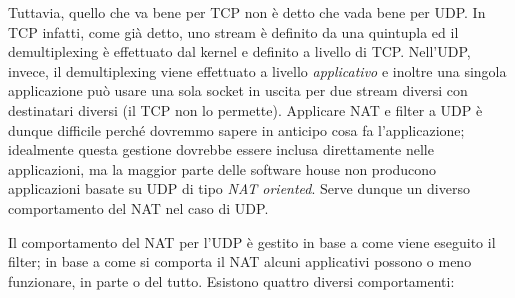 Tuttavia, quello che va bene per TCP non è detto che vada bene per UDP. In TCP infatti, come già detto, uno stream è definito da una quintupla ed il demultiplexing è effettuato dal kernel e definito a livello di TCP. Nell'UDP, invece, il demultiplexing viene effettuato a livello \textit{applicativo} e inoltre una singola applicazione può usare una sola socket in uscita per due stream diversi con destinatari diversi (il TCP non lo permette). Applicare NAT e filter a UDP è dunque difficile perché dovremmo sapere in anticipo cosa fa l'applicazione; idealmente questa gestione dovrebbe essere inclusa direttamente nelle applicazioni, ma la maggior parte delle software house non producono applicazioni basate su UDP di tipo \textit{NAT oriented}. Serve dunque un diverso comportamento del NAT nel caso di UDP.

Il comportamento del NAT per l'UDP è gestito in base a come viene eseguito il filter; in base a come si comporta il NAT alcuni applicativi possono o meno funzionare, in parte o del tutto. Esistono quattro diversi comportamenti:
